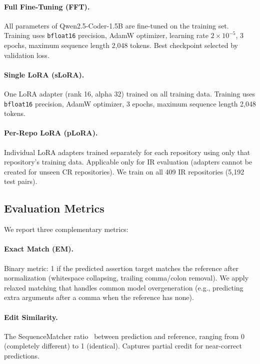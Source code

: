 \documentclass[11pt]{article}
\begin{document}
\paragraph{Full Fine-Tuning (FFT).}
All parameters of Qwen2.5-Coder-1.5B are fine-tuned on the training set.
Training uses \texttt{bfloat16} precision, AdamW optimizer, learning rate $2 \times 10^{-5}$, 3 epochs, maximum sequence length 2,048 tokens.
Best checkpoint selected by validation loss.

\paragraph{Single LoRA (sLoRA).}
One LoRA adapter (rank 16, alpha 32) trained on all training data.
Training uses \texttt{bfloat16} precision, AdamW optimizer, 3 epochs, maximum sequence length 2,048 tokens.

\paragraph{Per-Repo LoRA (pLoRA).}
Individual LoRA adapters trained separately for each repository using only that repository's training data.
Applicable only for IR evaluation (adapters cannot be created for unseen CR repositories).
We train on all 409 IR repositories (5,192 test pairs).

\subsection{Evaluation Metrics}
\label{sec:metrics}

We report three complementary metrics:

\paragraph{Exact Match (EM).}
Binary metric: 1 if the predicted assertion target matches the reference after normalization (whitespace collapsing, trailing comma/colon removal).
We apply relaxed matching that handles common model overgeneration (e.g., predicting extra arguments after a comma when the reference has none).

\paragraph{Edit Similarity.}
The SequenceMatcher ratio~\cite{python_difflib} between prediction and reference, ranging from 0 (completely different) to 1 (identical).
Captures partial credit for near-correct predictions.
\end{document}
